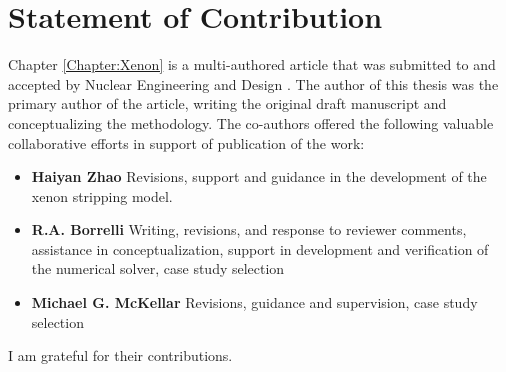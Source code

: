 \chapter{Statement of Contribution}
Chapter \ref{Chapter:Xenon} is a multi-authored article that was submitted to and accepted by Nuclear Engineering and Design \cite{RootXe}. The author of this thesis was the primary author of the article, writing the original draft manuscript and conceptualizing the methodology. The co-authors offered the following valuable collaborative efforts in support of publication of the work: 
\begin{itemize}
	\item \textbf{Haiyan Zhao} Revisions, support and guidance in the development of the xenon stripping model.
	\item \textbf{R.A. Borrelli} Writing, revisions, and response to reviewer comments, assistance in conceptualization, support in development and verification of the numerical solver, case study selection 
	\item \textbf{Michael G. McKellar} Revisions, guidance and supervision, case study selection
\end{itemize}

I am grateful for their contributions.